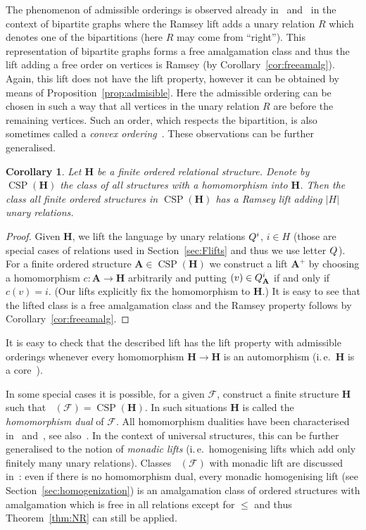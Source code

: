 \documentclass{elsarticle}
\newcommand{\ie}{i.\,e.}
\def\Forbh{\mathop{\mathrm{Forb_h}}\nolimits}
\def\CSP{\mathop{\mathrm{CSP}}\nolimits}
\def\str#1{\mathbf {#1}}
\def\extl#1#2{Q\ifstrempty{#1}{}{_{#1}}\ifstrempty{#2}{}{^{#2}}}
\def\ext#1#2{\extl{\ifstrempty{#1}{}{\str{#1}}}{#2}}
\def\F{{\mathcal F}}
\theoremstyle{plain}
\newtheorem{corollary}[theorem]{Corollary}
\theoremstyle{definition}
\theoremstyle{remark}
\begin{document}
The phenomenon of admissible orderings is observed already in~\cite{Nevsetvril1989a} and~\cite{Kechris2005} in the context of bipartite graphs where the Ramsey lift adds a unary relation $R$ which
denotes one of the bipartitions (here $R$ may come from ``right''). This representation of bipartite graphs forms a free amalgamation class and thus the lift adding a free order on vertices is Ramsey (by Corollary~\ref{cor:freeamalg}).
Again, this lift does not have the lift property, however it can be obtained by means of Proposition~\ref{prop:admisible}.
Here the admissible ordering can be chosen in such a way that all vertices in the unary relation $R$ are before the remaining vertices. Such an order, which respects the bipartition, is also sometimes called a \emph{convex ordering}~\cite{Kechris2005}.
These observations can be further generalised.
\begin{corollary}
\label{cor:Hcolor}
Let $\str{H}$ be a finite ordered relational structure. Denote by $\CSP(\str{H})$ the class
of all structures with a homomorphism into $\str{H}$. Then the class
all finite ordered structures in $\CSP(\str{H})$ has a Ramsey lift adding $\vert H\vert $ unary relations.
\end{corollary}

\begin{proof}
Given $\str{H}$, we  lift the language by unary relations $\ext{}{i}$, $i\in H$ (those are special cases of relations used in Section~\ref{sec:Flifts} and thus we use letter $\ext{}{}$).
For a finite ordered structure $\str{A}\in \CSP(\str{H})$ we construct a lift $\str{A}^+$ by choosing a homomorphism $c\colon\str{A}\to \str{H}$ arbitrarily and putting $(v)\in \ext{A}{i}$ if and only if $c(v)=i$. (Our lifts explicitly fix the homomorphism to $\str{H}$.) It is easy to see that the lifted class is a free amalgamation class and the Ramsey property follows by Corollary~\ref{cor:freeamalg}.
\end{proof}
It is easy to check that the described lift has the lift property with admissible orderings
  whenever every homomorphism $\str{H}\to\str{H}$ is an automorphism (\ie{}\ $\str{H}$ is a core~\cite{Hell2004}).

In some special cases it is possible, for a given $\F$, construct a finite structure $\str{H}$ such that $\Forbh(\F)=\CSP(\str{H})$.
In such situations $\str{H}$ is called the \emph{homomorphism dual} of $\F$.
All homomorphism dualities have been characterised in~\cite{Nesetril2000} and~\cite{Erdos2012}, see also~\cite{Kun2008}.
In the context of universal structures, this can be further generalised to the notion of
\emph{monadic lifts} (\ie{}\ homogenising lifts which add only finitely many unary relations). Classes $\Forbh(\F)$ with
monadic lift are discussed in~\cite{Hubicka2009}: even if there is no homomorphism dual, 
every monadic homogenising lift (see Section~\ref{sec:homogenization}) is an amalgamation class of ordered structures with amalgamation which is free in all relations except for $\leq$ and thus Theorem~\ref{thm:NR} can still be applied.  
\end{document}
